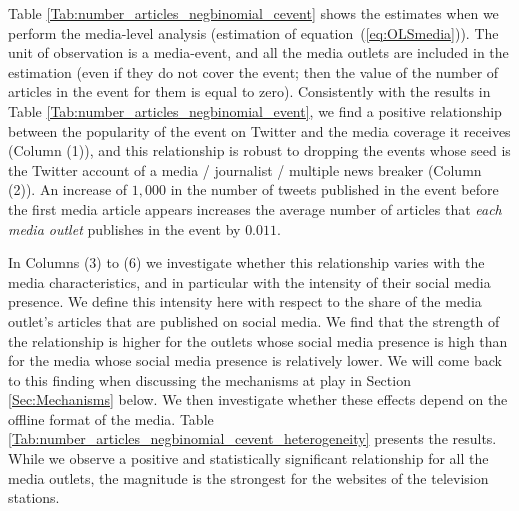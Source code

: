 Table \ref{Tab:number_articles_negbinomial_cevent} shows the estimates when we perform the media-level analysis (estimation of equation~(\ref{eq:OLSmedia})). The unit of observation is a media-event, and all the media outlets are included in the estimation (even if they do not cover the event; then the value of the number of articles in the event for them is equal to zero). Consistently with the results in Table \ref{Tab:number_articles_negbinomial_event}, we find a positive relationship between the popularity of the event on Twitter and the media coverage it receives (Column (1)), and this relationship is robust to dropping the events whose seed is the Twitter account of a media / journalist / multiple news breaker (Column (2)). An increase of $1,000$ in the number of tweets published in the event before the first media article appears increases the average number of articles that \textit{each media outlet} publishes in the event by $0.011$. 

In Columns (3) to (6) we investigate whether this relationship varies with the media characteristics, and in particular with the intensity of their social media presence. We define this intensity here with respect to the share of the media outlet's articles that are published on social media. We find that the strength of the relationship is higher for the outlets whose social media presence is high than for the media whose social media presence is relatively lower. We will come back to this finding when discussing the mechanisms at play in Section \ref{Sec:Mechanisms} below. We then investigate whether these effects depend on the offline format of the media. Table \ref{Tab:number_articles_negbinomial_cevent_heterogeneity} presents the results. While we observe a positive and statistically significant relationship for all the media outlets, the magnitude is the strongest for the websites of the television stations.


